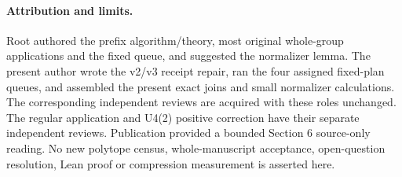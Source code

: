 \documentclass[10pt]{article}
\begin{document}
\paragraph{Attribution and limits.}
Root authored the prefix algorithm/theory, most original whole-group
applications and the fixed queue, and suggested the normalizer lemma.
The present author wrote the v2/v3 receipt repair, ran the four assigned
fixed-plan queues, and assembled the present exact joins and small
normalizer calculations. The corresponding independent reviews are
acquired with these roles unchanged. The regular application and U4(2)
positive correction have their separate independent reviews. Publication
provided a bounded Section 6 source-only reading. No new polytope census,
whole-manuscript acceptance, open-question resolution, Lean proof or
compression measurement is asserted here.
\end{document}
